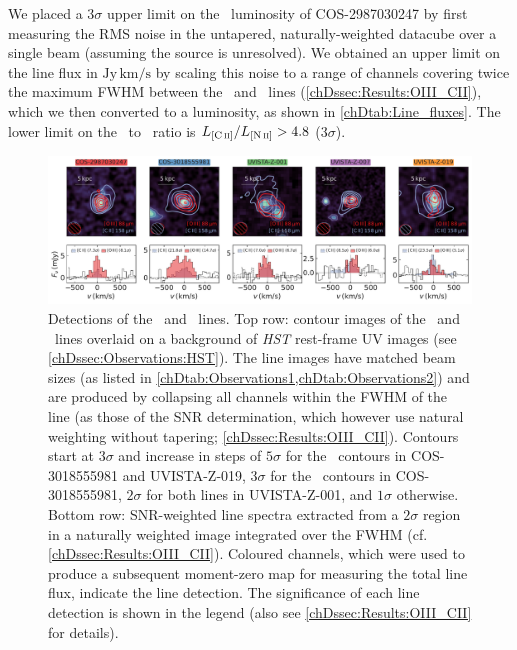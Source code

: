 We placed a $3 \sigma$ upper limit on the \NII\ luminosity of COS-2987030247 by first measuring the RMS noise in the untapered, naturally-weighted datacube over a single beam (assuming the source is unresolved). We obtained an upper limit on the line flux in $\mathrm{Jy \, km/s}$ by scaling this noise to a range of channels covering twice the maximum FWHM between the \OIIIf\ and \CII\ lines (\cref{chDssec:Results:OIII_CII}), which we then converted to a luminosity, as shown in \cref{chDtab:Line_fluxes}. The lower limit on the \CIILam\ to \NIILam\ ratio is $L_\CII/L_\NII > 4.8$ ($3 \sigma$).
\begin{figure}
    \centering
    \includegraphics[width=\linewidth]{"Plots/ChapterD/Line_maps_spectra_clean_cube"}
    \caption[Detections of the \CII\ and \OIIIf\ lines.]{Detections of the \CIILam\ and \OIIILam\ lines. Top row: contour images of the \CII\ and \OIIIf\ lines overlaid on a background of \textit{HST} rest-frame UV images (see \cref{chDssec:Observations:HST}). The line images have matched beam sizes (as listed in \cref{chDtab:Observations1,chDtab:Observations2}) and are produced by collapsing all channels within the FWHM of the line (as those of the SNR determination, which however use natural weighting without tapering; \cref{chDssec:Results:OIII_CII}). Contours start at $3 \sigma$ and increase in steps of $5 \sigma$ for the \CII\ contours in COS-3018555981 and UVISTA-Z-019, $3 \sigma$ for the \OIIIf\ contours in COS-3018555981, $2 \sigma$ for both lines in UVISTA-Z-001, and $1 \sigma$ otherwise. Bottom row: SNR-weighted line spectra extracted from a $2 \sigma$ region in a naturally weighted image integrated over the FWHM (cf. \cref{chDssec:Results:OIII_CII}). Coloured channels, which were used to produce a subsequent moment-zero map for measuring the total line flux, indicate the line detection. The significance of each line detection is shown in the legend (also see \cref{chDssec:Results:OIII_CII} for details).
    }
    \label{chDfig:CII_and_OIII_maps_and_spectra}
\end{figure}

